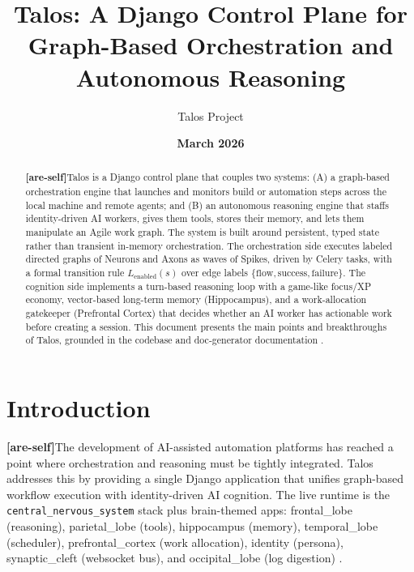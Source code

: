 \documentclass[11pt]{article}
\title{Talos: A Django Control Plane for Graph-Based Orchestration and Autonomous Reasoning}
\author{Talos Project}
\date{\textbf{March 2026}}
\newcommand{\areself}{\textbf{[are-self]}}
\begin{document}
	\maketitle
	
	\begin{abstract}
		\label{are-self:abstract}
		\areself Talos is a Django control plane that couples two systems: (A) a graph-based orchestration engine that launches and monitors build or automation steps across the local machine and remote agents; and (B) an autonomous reasoning engine that staffs identity-driven AI workers, gives them tools, stores their memory, and lets them manipulate an Agile work graph. The system is built around persistent, typed state rather than transient in-memory orchestration. The orchestration side executes labeled directed graphs of Neurons and Axons as waves of Spikes, driven by Celery tasks, with a formal transition rule $L_{\text{enabled}}(s)$ over edge labels $\{\text{flow}, \text{success}, \text{failure}\}$. The cognition side implements a turn-based reasoning loop with a game-like focus/XP economy, vector-based long-term memory (Hippocampus), and a work-allocation gatekeeper (Prefrontal Cortex) that decides whether an AI worker has actionable work before creating a session. This document presents the main points and breakthroughs of Talos, grounded in the codebase and doc-generator documentation \cite{talosLiveCodebase,talosCombined,talosCNS,talosFrontal,talosParietal,talosHippocampus,talosTemporal,talosPFC,talosIdentity,talosSynaptic,talosOccipital,talosPNS,talosEnvironments}.
	\end{abstract}
	
	\section{Introduction}
	\label{are-self:intro}
	\areself The development of AI-assisted automation platforms has reached a point where orchestration and reasoning must be tightly integrated. Talos addresses this by providing a single Django application that unifies graph-based workflow execution with identity-driven AI cognition. The live runtime is the \texttt{central\_nervous\_system} stack plus brain-themed apps: frontal\_lobe (reasoning), parietal\_lobe (tools), hippocampus (memory), temporal\_lobe (scheduler), prefrontal\_cortex (work allocation), identity (persona), synaptic\_cleft (websocket bus), and occipital\_lobe (log digestion) \cite{talosLiveCodebase}.
	
\end{document}
